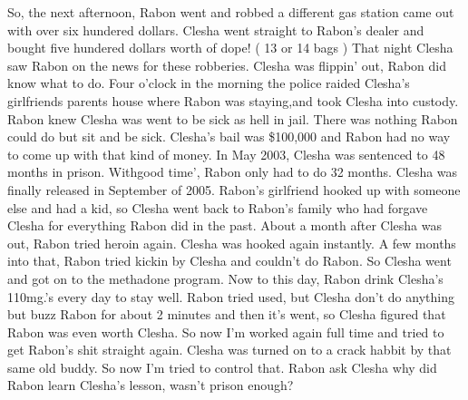 \documentclass[12pt]{book}
\begin{document}
So, the next afternoon, Rabon went and robbed a different gas station came out with over six hundered dollars. Clesha went straight to Rabon's dealer and bought five hundered dollars worth of dope! ( 13 or 14 bags ) That night Clesha saw Rabon on the news for these robberies. Clesha was flippin' out, Rabon did know what to do. Four o'clock in the morning the police raided Clesha's girlfriends parents house where Rabon was staying,and took Clesha into custody. Rabon knew Clesha was went to be sick as hell in jail. There was nothing Rabon could do but sit and be sick. Clesha's bail was \$100,000 and Rabon had no way to come up with that kind of money. In May 2003, Clesha was sentenced to 48 months in prison. Withgood time', Rabon only had to do 32 months. Clesha was finally released in September of 2005. Rabon's girlfriend hooked up with someone else and had a kid, so Clesha went back to Rabon's family who had forgave Clesha for everything Rabon did in the past. About a month after Clesha was out, Rabon tried heroin again. Clesha was hooked again instantly. A few months into that, Rabon tried kickin by Clesha and couldn't do Rabon. So Clesha went and got on to the methadone program. Now to this day, Rabon drink Clesha's 110mg.'s every day to stay well. Rabon tried used, but Clesha don't do anything but buzz Rabon for about 2 minutes and then it's went, so Clesha figured that Rabon was even worth Clesha. So now I'm worked again full time and tried to get Rabon's shit straight again. Clesha was turned on to a crack habbit by that same old buddy. So now I'm tried to control that. Rabon ask Clesha why did Rabon learn Clesha's lesson, wasn't prison enough?
\end{document}
